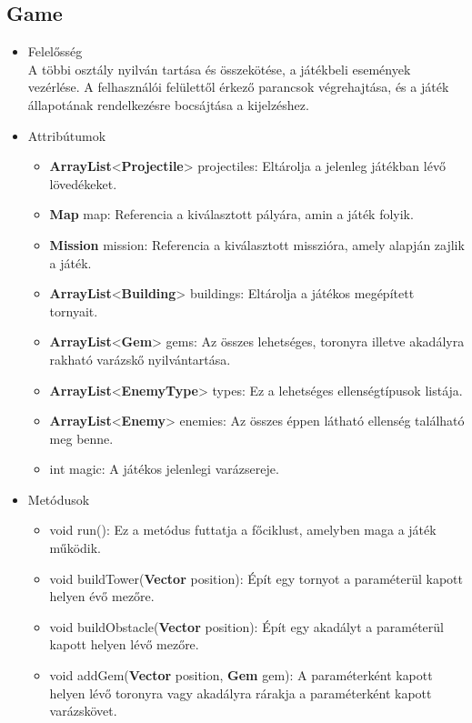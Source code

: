 \subsection{Game}
\begin{itemize}
\item Felelősség\\
A többi osztály nyilván tartása és összekötése, a játékbeli események vezérlése. A felhasználói felülettől érkező parancsok végrehajtása, és a játék állapotának rendelkezésre bocsájtása a kijelzéshez.
\item Attribútumok
	\begin{itemize}
		\item \textbf{ArrayList}<\textbf{Projectile}> projectiles: Eltárolja a jelenleg játékban lévő lövedékeket.
		\item \textbf{Map} map: Referencia a kiválasztott pályára, amin a játék folyik.
		\item \textbf{Mission} mission: Referencia a kiválasztott misszióra, amely alapján zajlik a játék.
		\item \textbf{ArrayList}<\textbf{Building}> buildings: Eltárolja a játékos megépített tornyait.
		\item \textbf{ArrayList}<\textbf{Gem}> gems: Az összes lehetséges, toronyra illetve akadályra rakható varázskő nyilvántartása.
		\item \textbf{ArrayList}<\textbf{EnemyType}> types: Ez a lehetséges ellenségtípusok listája.
		\item \textbf{ArrayList}<\textbf{Enemy}> enemies: Az összes éppen látható ellenség található meg benne.
		\item int magic: A játékos jelenlegi varázsereje.
	\end{itemize}
\item Metódusok
	\begin{itemize}
		\item void run(): Ez a metódus futtatja a főciklust, amelyben maga a játék működik.
		\item void buildTower(\textbf{Vector} position): Épít egy tornyot a paraméterül kapott helyen évő mezőre.
		\item void buildObstacle(\textbf{Vector} position): Épít egy akadályt a paraméterül kapott helyen lévő mezőre.
		\item void addGem(\textbf{Vector} position, \textbf{Gem} gem): A paraméterként kapott helyen lévő toronyra vagy akadályra rárakja a paraméterként kapott varázskövet.
	\end{itemize}
\end{itemize}




